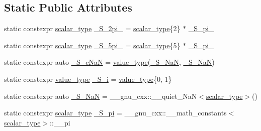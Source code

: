 \subsection*{Static Public Attributes}
\begin{DoxyCompactItemize}
\item 
static constexpr \hyperlink{classstd_1_1____detail_1_1__Airy_a266cdfcc86b36c8743fd0e102387e1f0}{scalar\+\_\+type} \hyperlink{classstd_1_1____detail_1_1__Airy_adb8691cb3550f4a7037a987d9b118671}{\+\_\+\+S\+\_\+2pi\+\_} = \hyperlink{classstd_1_1____detail_1_1__Airy_a266cdfcc86b36c8743fd0e102387e1f0}{scalar\+\_\+type}\{2\} $\ast$ \hyperlink{classstd_1_1____detail_1_1__Airy_a2050b1922ed0b79c5231ada9dffc77e5}{\+\_\+\+S\+\_\+pi\+\_}
\item 
static constexpr \hyperlink{classstd_1_1____detail_1_1__Airy_a266cdfcc86b36c8743fd0e102387e1f0}{scalar\+\_\+type} \hyperlink{classstd_1_1____detail_1_1__Airy_a81972f7ec24b2d67c7bf928450a9589c}{\+\_\+\+S\+\_\+5pi\+\_} = \hyperlink{classstd_1_1____detail_1_1__Airy_a266cdfcc86b36c8743fd0e102387e1f0}{scalar\+\_\+type}\{5\} $\ast$ \hyperlink{classstd_1_1____detail_1_1__Airy_ab43a77e34022fb3e772ef6504bf9319e}{\+\_\+\+S\+\_\+pi\+\_}
\item 
static constexpr auto \hyperlink{classstd_1_1____detail_1_1__Airy_aee4964dc3e741181641483c6befa7338}{\+\_\+\+S\+\_\+c\+NaN} = \hyperlink{classstd_1_1____detail_1_1__Airy_a99e7e546930fbd7a846f6933a9b4b437}{value\+\_\+type}(\hyperlink{classstd_1_1____detail_1_1__Airy_a906b2ddeac8ea00ed389d8ba0a4ebcc7}{\+\_\+\+S\+\_\+\+NaN}, \hyperlink{classstd_1_1____detail_1_1__Airy_a906b2ddeac8ea00ed389d8ba0a4ebcc7}{\+\_\+\+S\+\_\+\+NaN})
\item 
static constexpr \hyperlink{classstd_1_1____detail_1_1__Airy_a99e7e546930fbd7a846f6933a9b4b437}{value\+\_\+type} \hyperlink{classstd_1_1____detail_1_1__Airy_ae5cbd31a89afec0cfb04cc51c1192c5b}{\+\_\+\+S\+\_\+i} = \hyperlink{classstd_1_1____detail_1_1__Airy_a99e7e546930fbd7a846f6933a9b4b437}{value\+\_\+type}\{0, 1\}
\item 
static constexpr auto \hyperlink{classstd_1_1____detail_1_1__Airy_a906b2ddeac8ea00ed389d8ba0a4ebcc7}{\+\_\+\+S\+\_\+\+NaN} = \+\_\+\+\_\+gnu\+\_\+cxx\+::\+\_\+\+\_\+quiet\+\_\+\+NaN$<$\hyperlink{classstd_1_1____detail_1_1__Airy_a266cdfcc86b36c8743fd0e102387e1f0}{scalar\+\_\+type}$>$()
\item 
static constexpr \hyperlink{classstd_1_1____detail_1_1__Airy_a266cdfcc86b36c8743fd0e102387e1f0}{scalar\+\_\+type} \hyperlink{classstd_1_1____detail_1_1__Airy_a299a1c3b18fed38b2d35956650c888ed}{\+\_\+\+S\+\_\+pi} = \+\_\+\+\_\+gnu\+\_\+cxx\+::\+\_\+\+\_\+math\+\_\+constants$<$\hyperlink{classstd_1_1____detail_1_1__Airy_a266cdfcc86b36c8743fd0e102387e1f0}{scalar\+\_\+type}$>$\+::\+\_\+\+\_\+pi

\end{DoxyCompactItemize}
